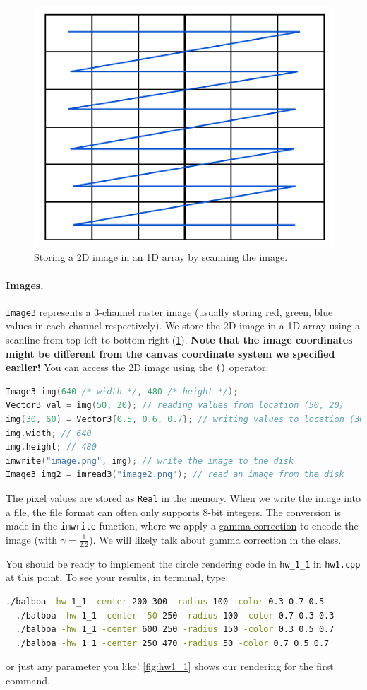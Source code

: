 \begin{figure}[h]
    \centering
    \includegraphics[width=0.4\linewidth]{imgs/scanline.pdf}
    \caption{Storing a 2D image in an 1D array by scanning the image.}
    \label{fig:scanline}
\end{figure}

\paragraph{Images.} \lstinline{Image3} represents a 3-channel raster image (usually storing red, green, blue values in each channel respectively). We store the 2D image in a 1D array using a scanline from top left to bottom right (\cref{fig:scanline}). 
\textbf{Note that the image coordinates might be different from the canvas coordinate system we specified earlier!}
You can access the 2D image using the \lstinline{()} operator:
\begin{lstlisting}[language=C++]
Image3 img(640 /* width */, 480 /* height */);
Vector3 val = img(50, 20); // reading values from location (50, 20)
img(30, 60) = Vector3{0.5, 0.6, 0.7}; // writing values to location (30, 60)
img.width; // 640
img.height; // 480
imwrite("image.png", img); // write the image to the disk
Image3 img2 = imread3("image2.png"); // read an image from the disk
\end{lstlisting}
The pixel values are stored as \lstinline{Real} in the memory. When we write the image into a file, the file format can often only supports 8-bit integers. The conversion is made in the \lstinline{imwrite} function, where we apply a \href{https://en.wikipedia.org/wiki/Gamma_correction}{gamma correction} to encode the image (with $\gamma=\frac{1}{2.2}$). We will likely talk about gamma correction in the class.

You should be ready to implement the circle rendering code in \lstinline{hw_1_1} in \lstinline{hw1.cpp} at this point. 
To see your results, in terminal, type:
\begin{lstlisting}[language=bash]
  ./balboa -hw 1_1 -center 200 300 -radius 100 -color 0.3 0.7 0.5
  ./balboa -hw 1_1 -center -50 250 -radius 100 -color 0.7 0.3 0.3
  ./balboa -hw 1_1 -center 600 250 -radius 150 -color 0.3 0.5 0.7
  ./balboa -hw 1_1 -center 250 470 -radius 50 -color 0.7 0.5 0.7
\end{lstlisting}
or just any parameter you like! \cref{fig:hw1_1} shows our rendering for the first command.

